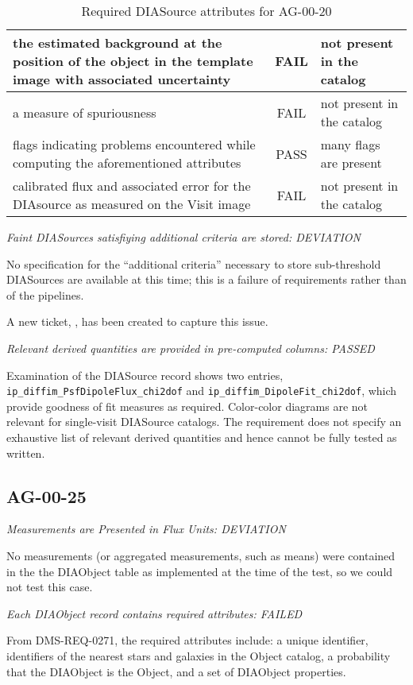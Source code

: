 \documentclass[DM,lsstdraft,STR,toc]{lsstdoc}
\begin{document}
\begin{table}[h]
\begin{tabular}{|p{}|c|p{}|}
		\hline
	the estimated background at the position of the object in the template image with associated uncertainty & FAIL & not present in the catalog \\
		\hline
	a measure of spuriousness & FAIL &  not present in the catalog \\
		\hline
	flags indicating problems encountered while computing the aforementioned attributes & PASS & many flags are present \\
		\hline
  calibrated flux and associated error for the DIAsource as measured on the Visit image & FAIL & not present in the catalog \\
		\hline
\end{tabular}
	\caption{Required DIASource attributes for AG-00-20 \label{tab:diasrc}}
\end{table}


\textit{Faint DIASources satisfiying additional criteria are stored: DEVIATION}

No specification for the ``additional criteria'' necessary to store 
sub-threshold DIASources are available at this time; 
this is a failure of requirements rather than of the pipelines.

A new ticket, , has been created to capture this issue.

\textit{Relevant derived quantities are provided in pre-computed columns: PASSED}

Examination of the DIASource record shows two entries,
\texttt{ip\_diffim\_PsfDipoleFlux\_chi2dof} and
\texttt{ip\_diffim\_DipoleFit\_chi2dof}, which provide goodness of fit measures
as required.  Color-color diagrams are not relevant for single-visit DIASource
catalogs. The requirement does not specify an exhaustive list of relevant
derived quantities and hence cannot be fully tested as written.

\subsection{AG-00-25}

\textit{Measurements are Presented in Flux Units: DEVIATION}

No measurements (or aggregated measurements, such as means) 
were contained in the the DIAObject table as implemented at the 
time of the test, so we could not test this case.

\textit{Each DIAObject record contains required attributes: FAILED}

From DMS-REQ-0271, the required attributes include: a unique identifier, 
identifiers of the nearest stars and galaxies in the Object catalog, 
a probability that the DIAObject is the Object, and a set of DIAObject 
properties.
\end{document}

